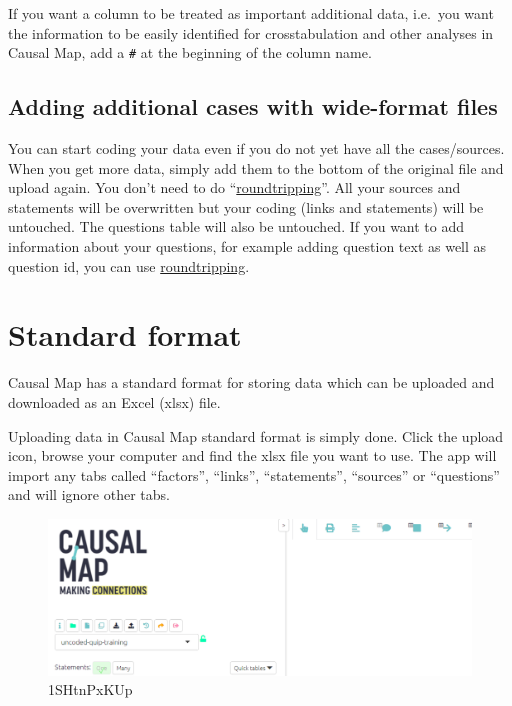 \documentclass[
]{book}
\begin{document}
If you want a column to be treated as important additional data, i.e.~you want the information to be easily identified for crosstabulation and other analyses in Causal Map, add a \texttt{\#} at the beginning of the column name.

\hypertarget{adding-additional-cases-with-wide-format-files}{%
\subsection{Adding additional cases with wide-format files}\label{adding-additional-cases-with-wide-format-files}}

You can start coding your data even if you do not yet have all the cases/sources. When you get more data, simply add them to the bottom of the original file and upload again. You don't need to do ``\protect\hyperlink{xroundtripping}{roundtripping}''. All your sources and statements will be overwritten but your coding (links and statements) will be untouched. The questions table will also be untouched. If you want to add information about your questions, for example adding question text as well as question id, you can use \protect\hyperlink{xroundtripping}{roundtripping}.

\hypertarget{standard-format}{%
\section{Standard format}\label{standard-format}}

Causal Map has a standard format for storing data which can be uploaded and downloaded as an Excel (xlsx) file.

Uploading data in Causal Map standard format is simply done. Click the upload icon, browse your computer and find the xlsx file you want to use. The app will import any tabs called ``factors'', ``links'', ``statements'', ``sources'' or ``questions'' and will ignore other tabs.

\begin{figure}
\centering
\includegraphics[width=6.77083in,height=\textheight]{_assets/1SHtnPxKUp.gif}
\caption{1SHtnPxKUp}
\end{figure}
\end{document}
